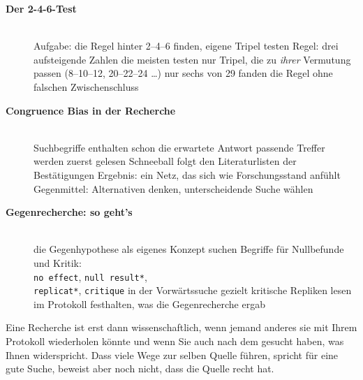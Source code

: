 \begin{description}
\item[{\rot\bf Der 2-4-6-Test}]~\\[-\lblskip]
\bi
  \ite Aufgabe: die Regel hinter 2--4--6 finden, eigene Tripel testen
  \ite Regel: drei aufsteigende Zahlen
  \ite die meisten testen nur Tripel, die zu \emph{ihrer} Vermutung passen
    (8--10--12, 20--22--24 \dots)
  \ite nur sechs von 29 fanden die Regel ohne falschen Zwischenschluss
    \parencite{wason1960failure}
\ei
\os{\newpage}

\item[{\rot\bf Congruence Bias in der Recherche}]~\\[-\lblskip]
\bi
  \ite Suchbegriffe enthalten schon die erwartete Antwort
  \ite passende Treffer werden zuerst gelesen
  \ite Schneeball folgt den Literaturlisten der Bestätigungen
  \ite Ergebnis: ein Netz, das sich wie Forschungsstand anfühlt
  \ite Gegenmittel: Alternativen denken, unterscheidende Suche wählen
    \parencite{baron2008thinking}
\ei
\os{\newpage}

\item[{\rot\bf Gegenrecherche: so geht's}]~\\[-\lblskip]
\bi
  \ite die Gegenhypothese als eigenes Konzept suchen
  \ite Begriffe für Nullbefunde und Kritik:\\
    \texttt{no effect},
    \texttt{null result*},\\
    \texttt{replicat*}, \texttt{critique}
  \ite in der Vorwärtssuche gezielt kritische Repliken lesen
  \ite im Protokoll festhalten, was die Gegenrecherche ergab
\ei
\os{\newpage}
\end{description}

\begin{merkbox}
Eine Recherche ist erst dann wissenschaftlich, wenn jemand anderes sie mit
Ihrem Protokoll wiederholen könnte und wenn Sie auch nach dem gesucht
haben, was Ihnen widerspricht. Dass viele Wege zur selben Quelle führen,
spricht für eine gute Suche, beweist aber noch nicht, dass die Quelle recht
hat.
\end{merkbox}
\os{\newpage}

